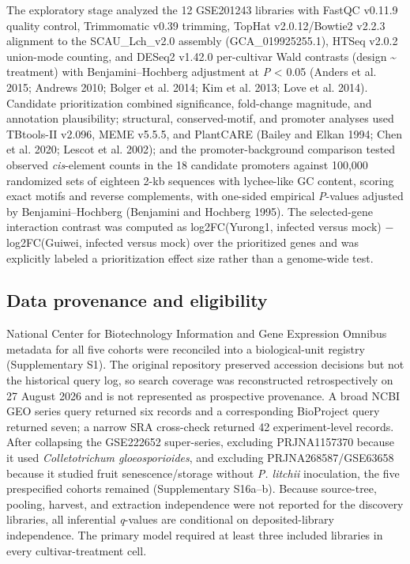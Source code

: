 \documentclass[12pt,letterpaper]{article}
\begin{document}
The exploratory stage analyzed the 12 GSE201243 libraries with FastQC v0.11.9 quality control, Trimmomatic v0.39 trimming, TopHat v2.0.12/Bowtie2 v2.2.3 alignment to the SCAU\_Lch\_v2.0 assembly (GCA\_019925255.1), HTSeq v2.0.2 union-mode counting, and DESeq2 v1.42.0 per-cultivar Wald contrasts (design \textasciitilde{} treatment) with Benjamini–Hochberg adjustment at \textit{P} < 0.05 (Anders et al. 2015; Andrews 2010; Bolger et al. 2014; Kim et al. 2013; Love et al. 2014). Candidate prioritization combined significance, fold-change magnitude, and annotation plausibility; structural, conserved-motif, and promoter analyses used TBtools-II v2.096, MEME v5.5.5, and PlantCARE (Bailey and Elkan 1994; Chen et al. 2020; Lescot et al. 2002); and the promoter-background comparison tested observed \textit{cis}-element counts in the 18 candidate promoters against 100,000 randomized sets of eighteen 2-kb sequences with lychee-like GC content, scoring exact motifs and reverse complements, with one-sided empirical \textit{P}-values adjusted by Benjamini–Hochberg (Benjamini and Hochberg 1995). The selected-gene interaction contrast was computed as log2FC(Yurong1, infected versus mock) − log2FC(Guiwei, infected versus mock) over the prioritized genes and was explicitly labeled a prioritization effect size rather than a genome-wide test.

\subsection*{Data provenance and eligibility}

National Center for Biotechnology Information and Gene Expression Omnibus metadata for all five cohorts were reconciled into a biological-unit registry (Supplementary S1). The original repository preserved accession decisions but not the historical query log, so search coverage was reconstructed retrospectively on 27 August 2026 and is not represented as prospective provenance. A broad NCBI GEO series query returned six records and a corresponding BioProject query returned seven; a narrow SRA cross-check returned 42 experiment-level records. After collapsing the GSE222652 super-series, excluding PRJNA1157370 because it used \textit{Colletotrichum gloeosporioides}, and excluding PRJNA268587/GSE63658 because it studied fruit senescence/storage without \textit{P. litchii} inoculation, the five prespecified cohorts remained (Supplementary S16a–b). Because source-tree, pooling, harvest, and extraction independence were not reported for the discovery libraries, all inferential \textit{q}-values are conditional on deposited-library independence. The primary model required at least three included libraries in every cultivar-treatment cell.
\end{document}
